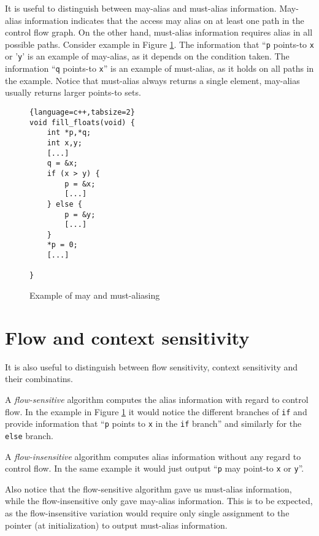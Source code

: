 It is useful to distinguish between may-alias and must-alias information.
May-alias information indicates that the access may alias on at least one path
in the control flow graph. On the other hand, must-alias information requires
alias in all possible paths. Consider example in Figure
\ref{alias-example-maymust}. The information that ``{\tt p} points-to {\tt x} or
'{\tt y}' is an example of may-alias, as it depends on the condition taken.
The information ``{\tt q} points-to {\tt x}'' is an example of must-alias, as it
holds on all paths in the example. Notice that must-alias always returns a
single element, may-alias usually returns larger points-to sets.

\begin{figure}[h!]
\label{alias-example-maymust}
\begin{tcolorbox}
\begin{lstlisting}{language=c++,tabsize=2}
void fill_floats(void) {
	int *p,*q;
	int x,y;
	[...]
	q = &x;
	if (x > y) {
		p = &x;
		[...]
	} else {
		p = &y;
		[...]
	}
	*p = 0;
	[...]
	
}
\end{lstlisting}
\end{tcolorbox}
\caption{Example of may and must-aliasing}
\end{figure}

\section{Flow and context sensitivity}

It is also useful to distinguish between flow sensitivity, context sensitivity
and their combinatins.

A {\it flow-sensitive} algorithm computes the alias information with regard to control
flow. In the example in Figure \ref{alias-example-maymust} it would notice the
different branches of {\tt if} and provide information that ``{\tt p} points to
{\tt x} in the {\tt if} branch'' and similarly for the {\tt else} branch.

A {\it flow-insensitive} algorithm computes alias information without any regard
to control flow. In the same example it would just output ``{\tt p} may point-to
{\tt x} or {\tt y}''.

Also notice that the flow-sensitive algorithm gave us must-alias
information, while the flow-insensitive only gave may-alias information.
This is to be expected, as the flow-insensitive variation would require only
single assignment to the pointer (at initialization) to output must-alias
information.

